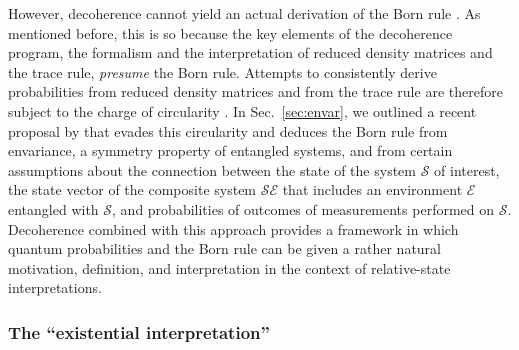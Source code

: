 \documentclass[twocolumn,rmp,aps,amsmath,amsfonts,noshowkeys,noshowpacs]{revtex4}
\begin{document}
However, decoherence cannot yield an actual derivation of the Born
rule \citep[for attempts in this direction,
see][]{Deutsch:1999:tz,Zurek:1998:re}.  As mentioned before, this is
so because the key elements of the decoherence program, the formalism
and the interpretation of reduced density matrices and the trace rule,
\emph{presume} the Born rule.  Attempts to consistently derive
probabilities from reduced density matrices and from the trace rule
are therefore subject to the charge of circularity
\citep{Zeh:1996:gy,Zurek:2002:ii}. In Sec.~\ref{sec:envar}, we
outlined a recent proposal by \citet{Zurek:2003:rv} that evades this
circularity and deduces the Born rule from envariance, a symmetry
property of entangled systems, and from certain assumptions about the
connection between the state of the system $\mathcal{S}$ of interest,
the state vector of the composite system $\mathcal{SE}$ that includes
an environment $\mathcal{E}$ entangled with $\mathcal{S}$, and
probabilities of outcomes of measurements performed on $\mathcal{S}$.
Decoherence combined with this approach provides a framework in which
quantum probabilities and the Born rule can be given a rather natural
motivation, definition, and interpretation in the context of
relative-state interpretations.


\subsubsection{\label{sec:exist-interpret}The ``existential
  interpretation''}
\end{document}
